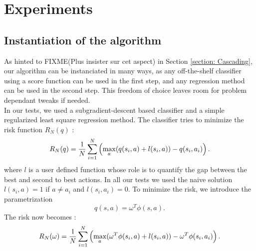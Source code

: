 \documentclass{llncs}
\newcommand{\0}{\mathbf{0}}
\newcommand{\1}{\mathbf{1}}
\begin{document}
\section{Experiments}
\label{section: experiments}
\subsection{Instantiation of the algorithm}
As hinted to FIXME(Plus insister sur cet aspect) in Section \ref{section: Cascading}, our algorithm can be instanciated in many ways, as any off-the-shelf classifier using a score function can be used in the first step, and any regression method can be used in the second step. This freedom of choice leaves room for problem dependant tweaks if needed.\\

In our tests, we used a subgradient-descent based classifier and a simple regularized least square regression method. The classifier tries to minimize the risk function $R_N(q)$ :
\begin{equation}
  R_N(q) = {1\over N} \sum_{i=1}^N\left(\max_{a}(q(s_i,a) + l(s_i,a)) - q(s_i,a_i) \right).
\end{equation}
where $l$ is a user defined function whose role is to quantify the gap between the best and second to best actions. In all our tests we used the naive solution $l(s_i,a) = 1$ if $a\neq a_i$ and $l(s_i,a_i) = 0$. To minimize the risk, we introduce the parametrization 
\begin{equation}
  q(s,a) = \omega^T\phi(s,a).
\end{equation}
The risk now becomes :
\begin{equation}
  R_N(\omega) = {1\over N} \sum_{i=1}^N\left(\max_{a}(\omega^T\phi(s_i,a) + l(s_i,a)) - \omega^T\phi(s_i,a_i) \right).
\end{equation}
\end{document}
